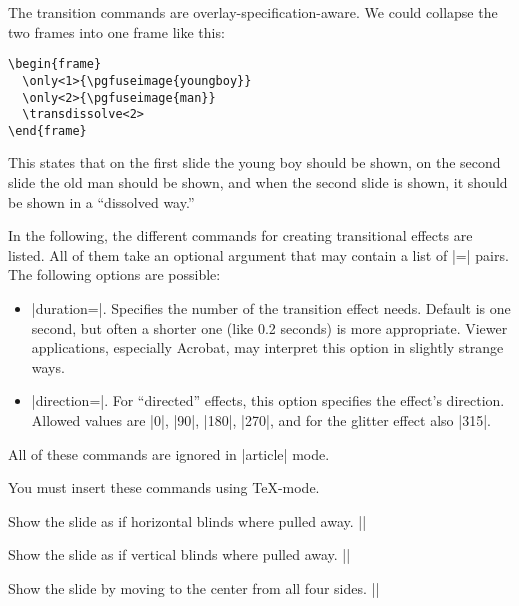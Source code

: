 The transition commands are overlay-specification-aware. We could
collapse the two frames into one frame like this:
\begin{verbatim}
\begin{frame}
  \only<1>{\pgfuseimage{youngboy}}
  \only<2>{\pgfuseimage{man}}
  \transdissolve<2>
\end{frame}
\end{verbatim}
This states that on the first slide the young boy should be shown, on
the second slide the old man should be shown, and when the second
slide is shown, it should be  shown in a ``dissolved way.''

In the following, the different commands for creating transitional
effects are listed. All of them take an optional argument that may
contain a list of |=| pairs. The following
options are possible:

\begin{itemize}
\item
  |duration=|. Specifies the number of 
  the transition effect needs. Default is one second, but often a
  shorter one (like 0.2 seconds) is more appropriate. Viewer
  applications, especially Acrobat, may interpret this option in
  slightly strange ways.
\item
  |direction=|. For ``directed'' effects, this option
  specifies the effect's direction. Allowed values are |0|, |90|,
  |180|, |270|, and for the glitter effect also |315|.
\end{itemize}

\articlenote
All of these commands are ignored in |article| mode.

\lyxnote
You must insert these commands using \TeX-mode.

\begin{command}{\transblindshorizontal{}}
  Show the slide as if horizontal blinds where pulled away.
  \example|\transblindshorizontal|
\end{command}
  
\begin{command}{\transblindsvertical{}}
  Show the slide as if vertical blinds where pulled away.
  \example||
\end{command}
  
\begin{command}{\transboxin{}}
  Show the slide by moving to the center from all four sides.
  \example||
\end{command}
  
